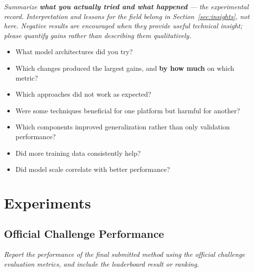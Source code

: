 \documentclass[letterpaper,10pt,conference]{ieeeconf}
\newcommand{\instruction}[1]{\textcolor{instructionblue}{\textit{#1}}}
\begin{document}
\instruction{
Summarize \textbf{what you actually tried and what happened} --- the experimental record.
Interpretation and lessons for the field belong in Section~\ref{sec:insights}, not here.
Negative results are encouraged when they provide useful technical insight; please quantify
gains rather than describing them qualitatively.
}

\begin{itemize}
    \item What model architectures did you try?
    \item Which changes produced the largest gains, and \textbf{by how much} on which metric?
    \item Which approaches did not work as expected?
    \item Were some techniques beneficial for one platform but harmful for another?
    \item Which components improved generalization rather than only validation performance?
    \item Did more training data consistently help?
    \item Did model scale correlate with better performance?
\end{itemize}

\section{Experiments}

\subsection{Official Challenge Performance}

\instruction{
Report the performance of the final submitted method using the official challenge
evaluation metrics, and include the leaderboard result or ranking.
}
\end{document}
